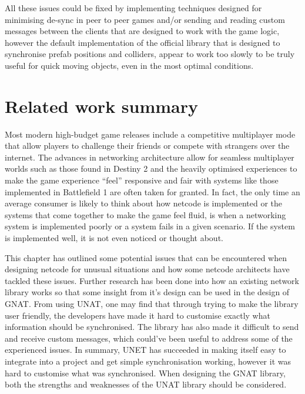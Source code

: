 All these issues could be fixed by implementing techniques designed for minimising de-sync in peer to peer games and/or sending and reading custom messages between the clients that are designed to work with the game logic, however the default implementation of the official library that is designed to synchronise prefab positions and colliders, appear to work too slowly to be truly useful for quick moving objects, even in the most optimal conditions.


\newpage

\section{Related work summary} \label{sec:related_work_sum}
Most modern high-budget game releases include a competitive multiplayer mode that allow players to challenge their friends or compete with strangers over the internet. The advances in networking architecture allow for seamless multiplayer worlds such as those found in Destiny 2 and the heavily optimised experiences to make the game experience ``feel'' responsive and fair with systems like those implemented in Battlefield 1 are often taken for granted. In fact, the only time an average consumer is likely to think about how netcode is implemented or the systems that come together to make the game feel fluid, is when a networking system is implemented poorly or a system fails in a given scenario. If the system is implemented well, it is not even noticed or thought about.

This chapter has outlined some potential issues that can be encountered when designing netcode for unusual situations and how some netcode architects have tackled these issues. Further research has been done into how an existing network library works so that some insight from it's design can be used in the design of GNAT.
From using UNAT, one may find that through trying to make the library user friendly, the developers have made it hard to customise exactly what information should be synchronised. The library has also made it difficult to send and receive custom messages, which could've been useful to address some of the experienced issues. In summary, UNET has succeeded in making itself easy to integrate into a project and get simple synchronisation working, however it was hard to customise what was synchronised. When designing the GNAT library, both the strengths and weaknesses of the UNAT library should be considered.
